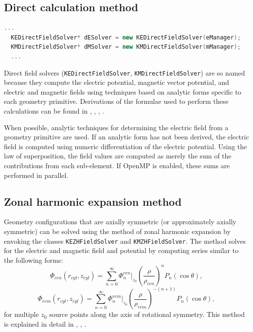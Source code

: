 \documentclass[11pt,a4paper,oneside]{article}
\begin{document}
\subsection{Direct calculation method}
\label{subsec:direct}

\begin{lstlisting}[language=C++]
  ...
  KEDirectFieldSolver* dESolver = new KEDirectFieldSolver(eManager);
  KMDirectFieldSolver* dMSolver = new KMDirectFieldSolver(mManager);
  ...
\end{lstlisting}

Direct field solvers (\texttt{KEDirectFieldSolver}, \texttt{KMDirectFieldSolver}) are so named because they compute the electric potential, magnetic vector potential, and electric and magnetic fields using techniques based on analytic forms specific to each geometry primitive.  Derivations of the formulae used to perform these calculations can be found in \cite{Glueck3}, \cite{Glueck4}, \cite{Glueck5}, \cite{Corona}.  

When possible, analytic techniques for determining the electric field from a geometry primitive are used.  If an analytic form has not been derived, the electric field is computed using numeric differentiation of the electric potential.  Using the law of superposition, the field values are computed as merely the sum of the contributions from each sub-element.  If OpenMP is enabled, these sums are performed in parallel.  

\subsection{Zonal harmonic expansion method}
\label{subsec:zhHarmonic}

Geometry configurations that are axially symmetric (or approximately axially symmetric) can be solved using the method of zonal harmonic expansion by envoking the classes \texttt{KEZHFieldSolver} and \texttt{KMZHFieldSolver}.  The method solves for the electric and magnetic field and potential by computing series similar to the following forms:
%
\begin{equation}
\Phi_{cen}(r_{cyl},z_{cyl}) = \sum_{n=0}^{\infty} \Phi^{cen}_{n}|_{z_{0}} \left( \frac{\rho}{\rho_{cen}}\right)^{n} P_{n}(\cos{\theta}),
\label{phiLegendreCen}
\end{equation}
%
\begin{equation}
\Phi_{rem}(r_{cyl},z_{cyl}) = \sum_{n=0}^{\infty} \Phi^{rem}_{n}|_{z_{0}} \left( \frac{\rho}{\rho_{rem}}\right)^{-(n+1)} P_{n}(\cos{\theta}),
\label{phiLegendreRem}
\end{equation}
%
for multiple $z_{0}$ source points along the axis of rotational symmetry.  This method is explained in detail in \cite{Glueck1}, \cite{Glueck2}, \cite{Corona}.  
\end{document}
